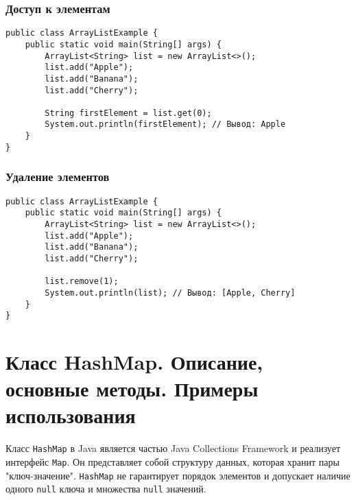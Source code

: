 \documentclass[12pt, a4paper]{article}
\begin{document}
\subsubsection*{Доступ к элементам}
\begin{verbatim}
public class ArrayListExample {
    public static void main(String[] args) {
        ArrayList<String> list = new ArrayList<>();
        list.add("Apple");
        list.add("Banana");
        list.add("Cherry");

        String firstElement = list.get(0);
        System.out.println(firstElement); // Вывод: Apple
    }
}
\end{verbatim}

\subsubsection*{Удаление элементов}
\begin{verbatim}
public class ArrayListExample {
    public static void main(String[] args) {
        ArrayList<String> list = new ArrayList<>();
        list.add("Apple");
        list.add("Banana");
        list.add("Cherry");

        list.remove(1);
        System.out.println(list); // Вывод: [Apple, Cherry]
    }
}
\end{verbatim}


\section{Класс HashMap. Описание, основные методы. Примеры использования}
Класс \texttt{HashMap} в Java является частью Java Collections Framework и реализует интерфейс \texttt{Map}. Он представляет собой структуру данных, которая хранит пары "ключ-значение". \texttt{HashMap} не гарантирует порядок элементов и допускает наличие одного \texttt{null} ключа и множества \texttt{null} значений.
\end{document}
